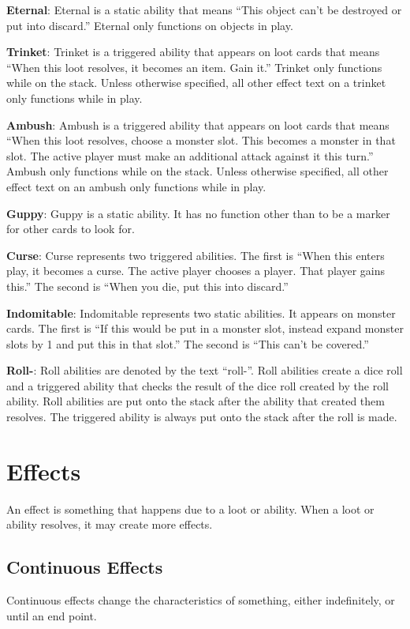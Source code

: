 \documentclass[a4paper, twoside]{report} %
\begin{document}
    \textbf{Eternal}: Eternal is a static ability that means “This object can’t be destroyed or put into discard.” Eternal only functions on objects in play.
    
    \textbf{Trinket}: Trinket is a triggered ability that appears on loot cards that means “When this loot resolves, it becomes an item. Gain it.” Trinket only functions while on the stack. Unless otherwise specified, all other effect text on a trinket only functions while in play.
    
    \textbf{Ambush}: Ambush is a triggered ability that appears on loot cards that means “When this loot resolves, choose a monster slot. This becomes a monster in that slot. The active player must make an additional attack against it this turn.” Ambush only functions while on the stack. Unless otherwise specified, all other effect text on an ambush only functions while in play.
    
    \textbf{Guppy}: Guppy is a static ability. It has no function other than to be a marker for other cards to look for.
    
    \textbf{Curse}: Curse represents two triggered abilities. The first is “When this enters play, it becomes a curse. The active player chooses a player. That player gains this.” The second is “When you die, put this into discard.”
    
    \textbf{Indomitable}: Indomitable represents two static abilities. It appears on monster cards. The first is “If this would be put in a monster slot, instead expand monster slots by 1 and put this in that slot.” The second is “This can’t be covered.”
    
    \textbf{Roll-}: Roll abilities are denoted by the text “roll-”. Roll abilities create a dice roll and a triggered ability that checks the result of the dice roll created by the roll ability. Roll abilities are put onto the stack after the ability that created them resolves. The triggered ability is always put onto the stack after the roll is made.

    \chapter{Effects}
    \label{effects}
    An effect is something that happens due to a loot or ability. When a loot or ability resolves, it may create more effects.
    
    \section{Continuous Effects}
    Continuous effects change the characteristics of something, either indefinitely, or until an end point.
\end{document}
